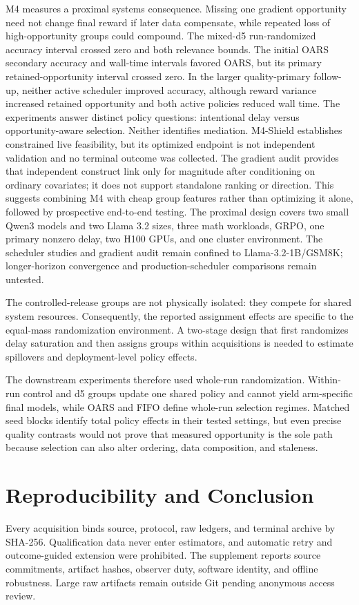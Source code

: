 \documentclass{article}
\begin{document}
M4 measures a proximal systems consequence. Missing one gradient opportunity need not change final reward if later data compensate, while repeated loss of high-opportunity groups could compound. The mixed-d5 run-randomized accuracy interval crossed zero and both relevance bounds. The initial OARS secondary accuracy and wall-time intervals favored OARS, but its primary retained-opportunity interval crossed zero. In the larger quality-primary follow-up, neither active scheduler improved accuracy, although reward variance increased retained opportunity and both active policies reduced wall time. The experiments answer distinct policy questions: intentional delay versus opportunity-aware selection. Neither identifies mediation. M4-Shield establishes constrained live feasibility, but its optimized endpoint is not independent validation and no terminal outcome was collected. The gradient audit provides that independent construct link only for magnitude after conditioning on ordinary covariates; it does not support standalone ranking or direction. This suggests combining M4 with cheap group features rather than optimizing it alone, followed by prospective end-to-end testing. The proximal design covers two small Qwen3 models and two Llama 3.2 sizes, three math workloads, GRPO, one primary nonzero delay, two H100 GPUs, and one cluster environment. The scheduler studies and gradient audit remain confined to Llama-3.2-1B/GSM8K; longer-horizon convergence and production-scheduler comparisons remain untested.

The controlled-release groups are not physically isolated: they compete for shared system resources. Consequently, the reported assignment effects are specific to the equal-mass randomization environment. A two-stage design that first randomizes delay saturation and then assigns groups within acquisitions is needed to estimate spillovers and deployment-level policy effects.

The downstream experiments therefore used whole-run randomization. Within-run control and d5 groups update one shared policy and cannot yield arm-specific final models, while OARS and FIFO define whole-run selection regimes. Matched seed blocks identify total policy effects in their tested settings, but even precise quality contrasts would not prove that measured opportunity is the sole path because selection can also alter ordering, data composition, and staleness.

\section{Reproducibility and Conclusion}
Every acquisition binds source, protocol, raw ledgers, and terminal archive by SHA-256. Qualification data never enter estimators, and automatic retry and outcome-guided extension were prohibited. The supplement reports source commitments, artifact hashes, observer duty, software identity, and offline robustness. Large raw artifacts remain outside Git pending anonymous access review.
\end{document}
